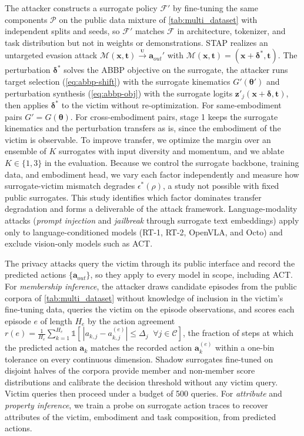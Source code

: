 The attacker constructs a surrogate policy $\mathcal{F}'$ by fine-tuning the same components $\mathcal{P}$ on the public data mixture of \autoref{tab:multi_dataset} with independent splits and seeds, so $\mathcal{F}'$ matches $\mathcal{F}$ in architecture, tokenizer, and task distribution but not in weights or demonstrations. 
STAP realizes an untargeted evasion attack $\mathcal{M}(\bm{x},\bm{t})\xrightarrow{{}_{\textbf{U}}}\bm{a}_{out}'$ with $\mathcal{M}(\bm{x},\bm{t})=(\bm{x}+\bm{\delta}^{*},\bm{t})$. The perturbation $\bm{\delta}^{*}$ solves the ABBP objective on the surrogate, \ie the attacker runs target selection (\autoref{eq:abbp-shift}) with the surrogate kinematics $G'(\bm{\theta}')$ and perturbation synthesis (\autoref{eq:abbp-obj}) with the surrogate logits $\bm{z}'_j(\bm{x}+\bm{\delta},\bm{t})$, then applies $\bm{\delta}^{*}$ to the victim without re-optimization. 
For same-embodiment pairs $G'=G(\bm{\theta})$. For cross-embodiment pairs, stage 1 keeps the surrogate kinematics and the perturbation transfers as is, since the embodiment of the victim is observable. To improve transfer, we optimize the margin over an ensemble of $K$ surrogates with input diversity and momentum, and we ablate $K\in\{1,3\}$ in the evaluation. Because we control the surrogate backbone, training data, and embodiment head, we vary each factor independently and measure how surrogate-victim mismatch degrades $\epsilon^{*}(\rho)$, a study not possible with fixed public surrogates. This study identifies which factor dominates transfer degradation and forms a deliverable of the attack framework. Language-modality attacks (\eg \emph{prompt injection} and \emph{jailbreak} through surrogate text embeddings) apply only to language-conditioned models (\ie RT-1, RT-2, OpenVLA, and Octo) and exclude vision-only models such as ACT.

 The privacy attacks query the victim through its public interface and record the predicted actions $\{\bm{a}_{out}\}$, so they apply to every model in scope, including ACT. For \emph{membership inference}, the attacker draws candidate episodes from the public corpora of \autoref{tab:multi_dataset} without knowledge of inclusion in the victim's fine-tuning data, queries the victim on the episode observations, and scores each episode $e$ of length $H_e$ by the action agreement $r(e)=\frac{1}{H_e}\sum_{k=1}^{H_e}\mathbb{1}[\,|a_{k,j}-a^{(e)}_{k,j}|\le\Delta_j\;\;\forall j\in\mathcal{C}]$, \ie the fraction of steps at which the predicted action $\bm{a}_k$ matches the recorded action $\bm{a}^{(e)}_k$ within a one-bin tolerance on every continuous dimension. Shadow surrogates fine-tuned on disjoint halves of the corpora provide member and non-member score distributions and calibrate the decision threshold without any victim query. Victim queries then proceed under a budget of 500 queries. For \emph{attribute} and \emph{property inference}, we train a probe on surrogate action traces to recover attributes of the victim, \eg embodiment and task composition, from predicted actions.




